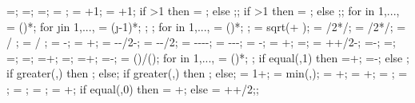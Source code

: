 {{=;
=;
=;
\storyminone = ;
\columnnumber = \baynumber+1; %
\levelnumber = \storynumber+1; %
if \storynumber>1 then {\nlevmo = ;} else {;};
if \baynumber>1 then {\ncolmo = ;} else {;};
for \iii in {1,...,{\levelnumber}}{
\y{\iii} = ()*\storyheight;
for \j in {1,...,{\columnnumber}}{
\x{\j} = (\j-1)*\baywidth;
};
};
for \idefl in {1,...,{\levelnumber}}{
	 = ()*\drift;
};
\tempdim = sqrt( + );
\fixbeamx = \framelinet/2*/\tempdim;
\fixbeamy = \framelinet/2*/\tempdim;
 =  / \storyheight * \baywidth;
 =  / \storyheight * \baywidth;
\rigbasestartx = -\supportwidth;
\rigbaseendx = \x{\columnnumber}+\supportwidth;
\isoboty = -\supportheight-\baselinet/2-\isolationdepth;
\isotopy = -\supportheight-\baselinet/2;
\foundboty = -\supportheight-\baselinet-\isolationdepth-\foundationdepth;
\foundtopy = -\supportheight-\baselinet-\isolationdepth;
\foundstartx = -\foundsidew;
\foundendx = \x{\columnnumber}+\foundsidew;
\structheight=\storynumber*\storyheight;
\isomidy = \supportheight+\isolinet+\isolationdepth/2-\baselinet;
\basewallstartx=-\supportwidth;
\buildingwidth=\baynumber*\baywidth;
\basewalldepth=\subfloors*\storyheight;
\basewallstarty=\basewalldepth;
\basewallendx=\buildingwidth+\supportwidth;
\basewallendy=\basewallstarty;
\rightsoilx=\buildingwidth+\rightsoildist;
\rightsoily=\basewalldepth-\rightsoildepth;
\isospace = (\buildingwidth)/();
for \kiso in {1,...,{\numberofisolators}}{
\xiso{\kiso} = ()*\isospace;
};
if equal(\isoshiftyn,1) then
{=+\isoshift;
\xiso{\numberofisolators}=\xiso{\numberofisolators}-\isoshift;}
else {};
if greater(\doflocfloor,\storynumber) then {;} else{};
if greater(\dofloccolumn,\columnnumber) then {;} else{};
\dofloch = 1+\doflocfloor;
\minlen = min(\storyheight,\baywidth);
\dofxx = \x{\dofloccolumn}+\dofoffsetratio*\minlen;
\dofyy = \y{\dofloch}+\dofoffsetratio*\minlen;
\arrlen = \arrowlenratio*\minlen;
\arrrad = ;
\Xaxesstarty = ;
\Yaxesstartx = ;
\Yaxesstarty = \y{\levelnumber}+\axisseperation;
if equal(\showsupports,0) then
{\Xaxesstartx = \x{\columnnumber}+\axisseperation;} else
{\Xaxesstartx = \x{\columnnumber}+\axisseperation+\supportwidth/2;};
}}
